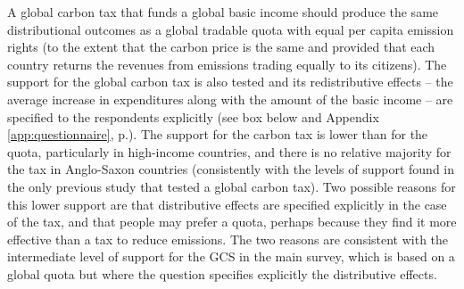 \begin{bibunit}
A global carbon tax that funds a global basic income should produce the same distributional outcomes as a global tradable quota with equal per capita emission rights (to the extent that the carbon price is the same and provided that each country returns the revenues from emissions trading equally to its citizens). %
The support for the global carbon tax is also tested and its redistributive effects --  the average increase in expenditures along with the amount of the basic income -- are specified to the respondents explicitly  (see box below and Appendix \ref{app:questionnaire}, p.\pageref{subsec:questionnaire_GCS}). %
The support for the carbon tax is lower than for the quota, particularly in high-income countries, and there is no relative majority for the tax in Anglo-Saxon countries (consistently with the levels of support found in the only previous study that tested a global carbon tax\cite{carattini_how_2019}). %
Two possible reasons for this lower support are that distributive effects are specified explicitly in the case of the tax, and that people may prefer a quota, perhaps because they find it more effective than a tax to reduce emissions. The two reasons are consistent with the intermediate level of support for the GCS in the main survey, which is based on a global quota but where the question specifies explicitly the distributive effects. %



\end{bibunit}
